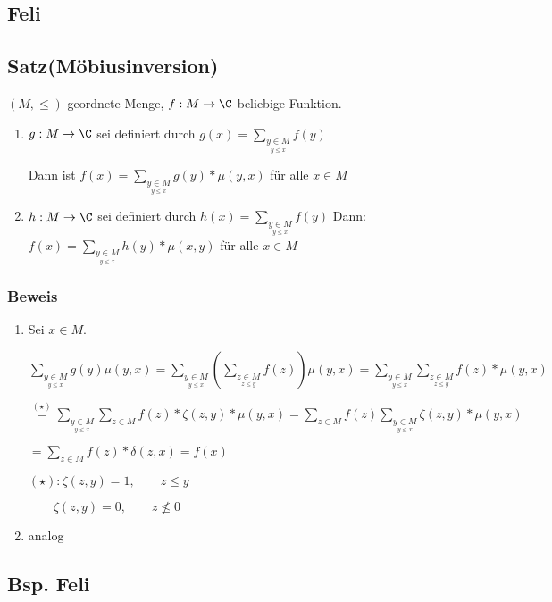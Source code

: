 \subsection{Feli}
\subsection{Satz(Möbiusinversion)}
$(M,\leq)$ geordnete Menge, $f: M\rightarrow \C$ beliebige Funktion.

\begin{enumerate}
	\item 	$g:M \rightarrow \C$ sei definiert durch $g(x) = \sum_{\underset{y\leq x}{y \in M} } f(y)$
	
			Dann ist $f(x) = \sum_{\underset{y\leq x}{y \in M}}	g(y) * \mu (y,x)$ für alle $x \in M$
			
	\item 	$h: M \rightarrow \C$ sei definiert durch $h(x)= \sum_{\underset{y\leq x}{y \in M}}f(y)$ Dann: 	$f(x)= \sum_{\underset{y\leq x}{y \in M}} h(y)*\mu (x,y)$ für alle $x \in M$ 
	
\end{enumerate}

\subsubsection*{Beweis}
\begin{enumerate}
	\item Sei $x \in M$.
	
	$\sum_{\underset{y\leq x}{y \in M}} g(y) \mu (y,x) = \sum_{\underset{y\leq x}{y \in M}}(\sum_{\underset{z\leq y}{z \in M}}f(z))\mu (y,x) = \sum_{\underset{y\leq x}{y \in M}}\sum_{\underset{z\leq y}{z \in M}} f(z) * \mu(y,x) $
	
	$\overset{(\star)}{=} \sum_{\underset{y\leq x}{y \in M}} \sum_{z \in M} f(z) * \zeta (z,y) * \mu (y,x) = \sum_{z \in M}f(z) \sum_{\underset{y\leq x}{y \in M}} \zeta (z,y)*\mu(y,x)$
	
	$= \sum_{z\in M} f(z)*\delta(z,x)=f(x)$
	
	$(\star): \zeta(z,y) = 1, \qquad z \leq y$
	
	$\qquad \zeta(z,y) = 0, \qquad z \nleq 0$
	\item analog
\end{enumerate}

\subsection{Bsp. Feli}